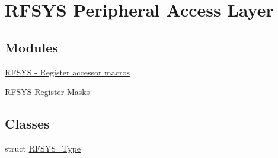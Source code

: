 \hypertarget{group__RFSYS__Peripheral__Access__Layer}{}\section{R\+F\+S\+YS Peripheral Access Layer}
\label{group__RFSYS__Peripheral__Access__Layer}
\subsection*{Modules}
\begin{DoxyCompactItemize}
\item 
\hyperlink{group__RFSYS__Register__Accessor__Macros}{R\+F\+S\+Y\+S -\/ Register accessor macros}
\item 
\hyperlink{group__RFSYS__Register__Masks}{R\+F\+S\+Y\+S Register Masks}
\end{DoxyCompactItemize}
\subsection*{Classes}
\begin{DoxyCompactItemize}
\item 
struct \hyperlink{structRFSYS__Type}{R\+F\+S\+Y\+S\+\_\+\+Type}
\end{DoxyCompactItemize}
